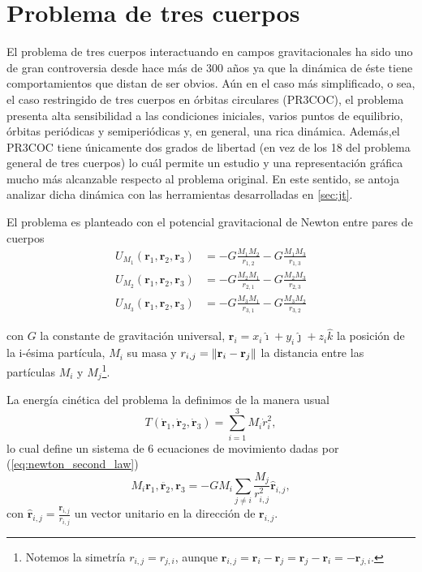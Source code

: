 \section{Problema de tres cuerpos}

El problema de tres cuerpos interactuando en campos gravitacionales ha sido uno de gran controversia desde hace más de 300 años ya que la dinámica de éste tiene comportamientos que distan de ser obvios. Aún en el caso más simplificado, o sea, el caso restringido de tres cuerpos en órbitas circulares (PR3COC), el problema presenta alta sensibilidad a las condiciones iniciales, varios puntos de equilibrio, órbitas periódicas y semiperiódicas y, en general, una rica dinámica. Además,el PR3COC tiene únicamente dos grados de libertad (en vez de los 18 del problema general de tres cuerpos) lo cuál permite un estudio y una representación gráfica mucho más alcanzable respecto al problema original. En este sentido, se antoja analizar dicha dinámica con las herramientas desarrolladas en \ref{sec:jt}.

El problema es planteado con el potencial gravitacional de Newton entre pares de cuerpos 
\begin{align}
 U_{M_1}(\mathbf{r}_1,\mathbf{r}_2,\mathbf{r}_3) &= -G \frac{M_1 M_2}{r_{1,2}} - G \frac{M_1 M_3}{r_{1,3}} \\
 U_{M_2}(\mathbf{r}_1,\mathbf{r}_2,\mathbf{r}_3) &= -G \frac{M_2 M_1}{r_{2,1}} - G \frac{M_2 M_3}{r_{2,3}} \\
 U_{M_3}(\mathbf{r}_1,\mathbf{r}_2,\mathbf{r}_3) &= -G \frac{M_3 M_1}{r_{3,1}} - G \frac{M_3 M_2}{r_{3,2}}
 \label{eq:3body_potential}
\end{align}

con $G$ la constante de gravitación universal, $\mathbf{r}_i = x_i \hat{\imath} + y_i \hat{\jmath} + z_i \hat{k}$ la posición de la i-ésima partícula, $M_i$ su masa y $r_{i,j} = \left\lVert \mathbf{r}_i - \mathbf{r}_j\right\rVert$ la distancia entre las partículas $M_i$ y $M_j$\footnote{Notemos la simetría $r_{i,j} = r_{j,i}$, aunque $\mathbf{r}_{i,j} = \mathbf{r}_i - \mathbf{r}_j = \mathbf{r}_j - \mathbf{r}_i  = - \mathbf{r}_{j,i}$.}. 

La energía cinética del problema la definimos de la manera usual 
\begin{equation}
 T(\dot{\mathbf{r}}_1,\dot{\mathbf{r}}_2,\dot{\mathbf{r}}_3) = \sum_{i=1}^3 M_i \dot{r}_i^2,
 \label{eq:3body_cinetic}
\end{equation}
lo cual define un sistema de 6 ecuaciones de movimiento dadas por (\ref{eq:newton_second_law})
\begin{equation}
 M_i \ddot{\mathbf{r}_1,\mathbf{r}_2,\mathbf{r}_3} = - G M_i \sum_{j\neq i} \frac{M_j}{r_{i,j}^2} \hat{\mathbf{r}}_{i,j},
 \label{eq:3body_eqs_motion}
\end{equation}
con $\hat{\mathbf{r}}_{i,j} = \frac{\mathbf{r}_{i,j}}{r_{i,j}}$ un vector unitario en la dirección de $\mathbf{r}_{i,j}$.

